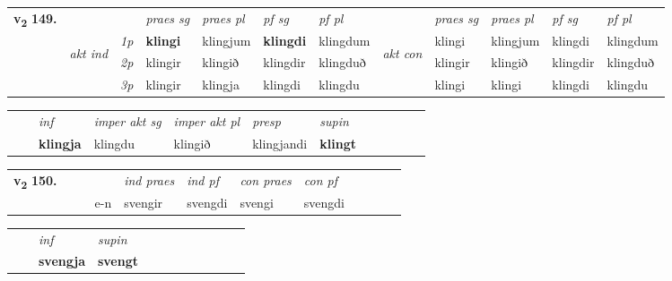 \begin{tabular}{llllllllllll} \toprule
\multirow{4}{*}{{{\textbf{v{\textsubscript{2}}} \Large{\textbf{149.}}}}}  & &   &  \textit{praes sg}  & \textit{praes pl}  &\textit{ pf sg} & \textit{pf pl} &  &  \textit{praes sg}  & \textit{praes pl}  & \textit{pf sg} & \textit{pf pl } \\*
	\cmidrule{4-7} \cmidrule{9-12}
 & \multirow{3}{*}{\begin{turn}{90}\textit{akt ind}\end{turn}} & {\textit{1p}} & \textbf{klingi} & klingjum    & \textbf{klingdi} & klingdum & \multirow{3}{*}{\begin{turn}{90}\textit{akt con}\end{turn}} &klingi & klingjum & klingdi & klingdum\\*
& &  {\textit{2p}} &  klingir  & klingið   & klingdir & klingduð & & klingir & klingið & klingdir & klingduð \\*
& &  {\textit{3p}} & klingir & klingja   & klingdi & klingdu & & klingi & klingi& klingdi & klingdu  \\*
\cmidrule{4-7} \cmidrule{9-12}
\end{tabular}


\begin{tabular}{llllllllllll}
 & & \textit{inf} & \textit{imper akt sg} & \textit{imper akt pl}   & \textit{presp} & \textit{supin}       \\*
  & & \textbf{klingja} & klingdu  & klingið   & klingjandi &  \textbf{klingt}   \\*
\cmidrule{1-12}
\end{tabular}





\begin{tabular}{llllllllllll}\toprule
\multirow{4}{*}{{{\textbf{v{\textsubscript{2}}} \Large{\textbf{150.}}}}}  & &  & &  \textit{ind praes} & \textit{ind pf} & \textit{con praes} & \textit{con pf} \\*
&  & & e-n & svengir & svengdi & svengi & svengdi \\*
\cmidrule{5-9}
\end{tabular}


\begin{tabular}{llllllllllll}
 & & \textit{inf}      & \textit{supin}       \\*
  & & \textbf{svengja}       &  \textbf{svengt}   \\*
\cmidrule{1-12}
\end{tabular}



